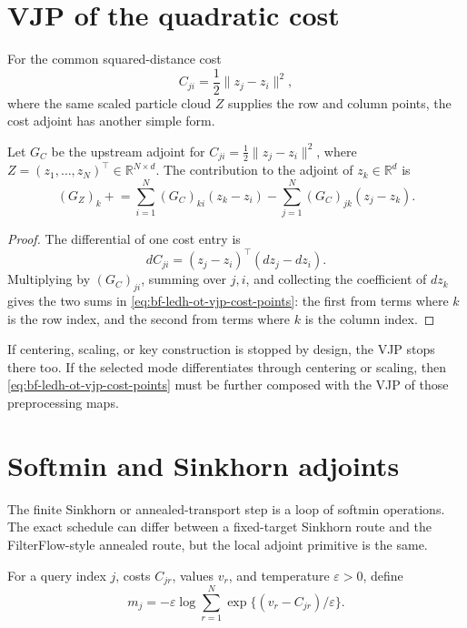 \section{VJP of the quadratic cost}
\label{sec:bf-ledh-ot-cost-vjp}

For the common squared-distance cost
\[
  C_{ji}=\frac{1}{2}\|z_j-z_i\|^2,
\]
where the same scaled particle cloud \(Z\) supplies the row and column points,
the cost adjoint has another simple form.

\begin{proposition}
\label{prop:bf-ledh-ot-cost-vjp}
Let \(G_C\) be the upstream adjoint for
\(C_{ji}=\frac12\|z_j-z_i\|^2\), where
\(Z=(z_1,\ldots,z_N)^\top\in\mathbb R^{N\times d}\).  The contribution to the
adjoint of \(z_k\in\mathbb R^d\) is
\begin{equation}
\label{eq:bf-ledh-ot-vjp-cost-points}
  (G_Z)_k
  \mathrel{+}=
  \sum_{i=1}^N (G_C)_{ki}(z_k-z_i)
  -
  \sum_{j=1}^N (G_C)_{jk}(z_j-z_k).
\end{equation}
\end{proposition}

\begin{proof}
The differential of one cost entry is
\[
  dC_{ji}=(z_j-z_i)^\top(dz_j-dz_i).
\]
Multiplying by \((G_C)_{ji}\), summing over \(j,i\), and collecting the
coefficient of \(dz_k\) gives the two sums in
\eqref{eq:bf-ledh-ot-vjp-cost-points}: the first from terms where \(k\) is the
row index, and the second from terms where \(k\) is the column index.
\end{proof}

If centering, scaling, or key construction is stopped by design, the VJP stops
there too.  If the selected mode differentiates through centering or scaling,
then \eqref{eq:bf-ledh-ot-vjp-cost-points} must be further composed with the
VJP of those preprocessing maps.

\section{Softmin and Sinkhorn adjoints}
\label{sec:bf-ledh-ot-softmin-vjp}

The finite Sinkhorn or annealed-transport step is a loop of softmin operations.
The exact schedule can differ between a fixed-target Sinkhorn route and the
FilterFlow-style annealed route, but the local adjoint primitive is the same.

\begin{definition}
\label{def:bf-ledh-ot-softmin}
For a query index \(j\), costs \(C_{jr}\), values \(v_r\), and temperature
\(\varepsilon>0\), define
\begin{equation}
\label{eq:bf-ledh-ot-softmin}
  m_j
  =
  -\varepsilon
  \log
  \sum_{r=1}^N
  \exp\{(v_r-C_{jr})/\varepsilon\}.
\end{equation}
\end{definition}

